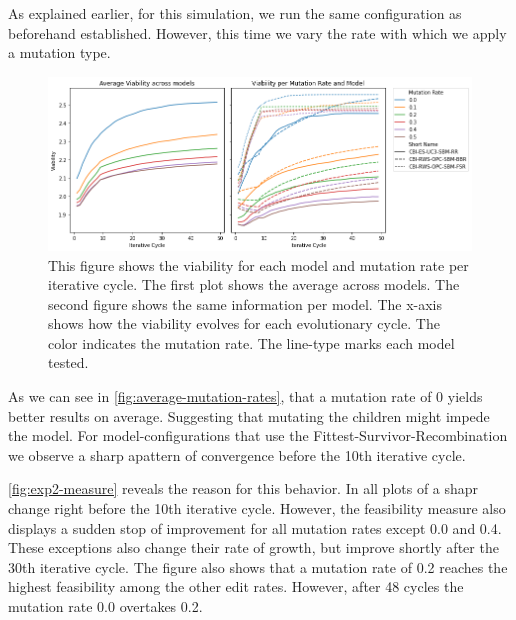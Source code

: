 \documentclass[./../../paper.tex]{subfiles}
\begin{document}
As explained earlier, for this simulation, we run the same configuration as beforehand established. However, this time we vary the rate with which we apply a mutation type. 

\begin{figure}[htbp]
    \centering
    \includegraphics[width=\textwidth]{figures/generated/exp2_viability_by_mrate_model.png}
    \caption{This figure shows the viability for each model and mutation rate per iterative cycle. The first plot shows the average across models. The second figure shows the same information per model. The x-axis shows how the viability evolves for each evolutionary cycle. The color indicates the mutation rate. The line-type marks each model tested.}
    \label{fig:average-mutation-rates}
\end{figure}


\noindent As we can see in \autoref{fig:average-mutation-rates}, that a mutation rate of 0 yields better results on average. Suggesting that mutating the children might impede the model. 
For model-configurations that use the Fittest-Survivor-Recombination we observe a sharp apattern of convergence before the 10th iterative cycle.  



\autoref{fig:exp2-measure} reveals the reason for this behavior.
In all plots of a shapr change right before the 10th iterative cycle. However, the feasibility measure also displays a sudden stop of improvement for all mutation rates except 0.0 and 0.4. These exceptions also change their rate of growth, but improve shortly after the 30th iterative cycle.  The figure also shows that a mutation rate of 0.2 reaches the highest feasibility among the other edit rates. However, after 48 cycles the mutation rate 0.0 overtakes 0.2.     
\end{document}
